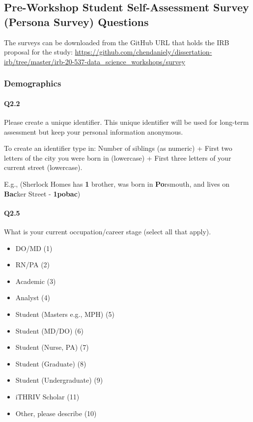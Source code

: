 \documentclass[020-persona\_validation.tex]{subfiles}
\begin{document}
\subsection{Pre-Workshop Student Self-Assessment Survey (Persona Survey) Questions}
\label{sse:persona-survey-questions}

The surveys can be downloaded from the GitHub URL that holds the IRB proposal for the study:
\url{https://github.com/chendaniely/dissertation-irb/tree/master/irb-20-537-data\_science_workshops/survey}

    \subsubsection{Demographics}

        \paragraph{Q2.2}

            Please create a unique identifier.
            This unique identifier will be used for long-term assessment but keep your personal information anonymous.

            To create an identifier type in:
            Number of siblings (as numeric) +
            First two letters of the city you were born in (lowercase) +
            First three letters of your current street (lowercase).

            E.g., (Sherlock Homes has \textbf{1} brother,
                was born in \textbf{Po}rsmouth,
                and lives on \textbf{Bac}ker Street - \textbf{1pobac})

        \paragraph{Q2.5}

            What is your current occupation/career stage (select all that apply).

            \begin{itemize}
                \item DO/MD  (1)
                \item RN/PA  (2)
                \item Academic  (3)
                \item Analyst  (4)
                \item Student (Masters e.g., MPH)  (5)
                \item Student (MD/DO)  (6)
                \item Student (Nurse, PA)  (7)
                \item Student (Graduate)  (8)
                \item Student (Undergraduate)  (9)
                \item iTHRIV Scholar  (11)
                \item Other, please describe  (10)
            \end{itemize}
\end{document}
